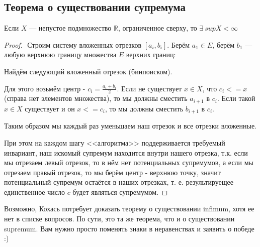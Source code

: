 \newpage
{}
\subsection{Теорема о существовании супремума}
\begin{theorem*}
    Если $X$ --- непустое подмножество $\mathbb{R}$, ограниченное сверху, то $\exists \ supX < \infty$
\end{theorem*}
\begin{proof}$ $
    Строим систему вложенных отрезков $[a_i, b_i]$. Берём $a_1 \in E$, берём $b_1$ {---} любую верхнюю границу множества $E$ верхних границ:
    
    Найдём следующий вложенный отрезок (бинпоиском).
    
    Для этого возьмём центр - $c_i = \frac{a_i + b_i}{2}$.
    Если не существует $x \in X$, что $c_i <= x$ (справа нет элементов множества), то мы должны сместить $a_{i+1}$ в $c_i$.
    Если такой $x \in X$ существует и он $x <= c_i$, то мы должны сместить $b_{i+1}$ в $c_i$.
    
    Таким образом мы каждый раз уменьшаем наш отрезок и все отрезки вложенные.
    
    При этом на каждом шагу <<алгоритма>> поддерживается требуемый инвариант, наш искомый супремум находится внутри нашего отрезка, т.к. если мы отрезаем левый отрезок, то в нём нет потенциальных супремумов, а если мы отрезаем правый отрезок, то мы берём центр - верхнюю точку, значит потенциальный супремум остаётся в наших отрезках, т. е. результируещее единственное число $c$ будет являться супремумом.
    
    
    
    
\end{proof}
\begin{remark}
    Возможно, Кохась потребует доказать теорему о существовании infimum, хотя ее нет в списке вопросов. По сути, это та же теорема, что и о существовании supremum. Вам нужно просто поменять знаки в неравенствах и заявить о победе :)
\end{remark}
\newpage
